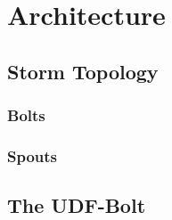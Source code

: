 \section{Architecture}
\label{sect:Architecture}


\subsection{Storm Topology}

\subsubsection{Bolts}

\subsubsection{Spouts}


\subsection{The UDF-Bolt}
